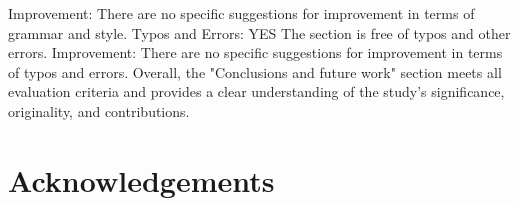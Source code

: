 \documentclass{article}%
\begin{document}
\newline%
Improvement: There are no specific suggestions for improvement in terms of grammar and style.\newline%
\newline%
Typos and Errors: YES\newline%
The section is free of typos and other errors.\newline%
\newline%
Improvement: There are no specific suggestions for improvement in terms of typos and errors.\newline%
\newline%
Overall, the "Conclusions and future work" section meets all evaluation criteria and provides a clear understanding of the study's significance, originality, and contributions.

%
\newpage%
\section*{Acknowledgements}


\vspace{6pt} 










\end{document}
